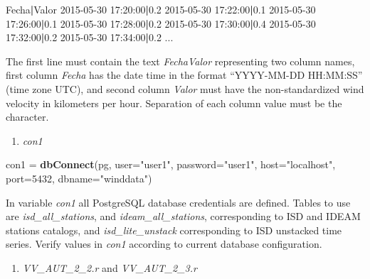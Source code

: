 \documentclass[12pt,twoside]{reedthesis}
\newenvironment{Shaded}{\begin{snugshade}}{\end{snugshade}}
\newcommand{\DataTypeTok}[1]{\textcolor[rgb]{0.13,0.29,0.53}{#1}}
\newcommand{\DecValTok}[1]{\textcolor[rgb]{0.00,0.00,0.81}{#1}}
\newcommand{\ExtensionTok}[1]{#1}
\newcommand{\KeywordTok}[1]{\textcolor[rgb]{0.13,0.29,0.53}{\textbf{#1}}}
\newcommand{\NormalTok}[1]{#1}
\newcommand{\StringTok}[1]{\textcolor[rgb]{0.31,0.60,0.02}{#1}}
\providecommand{\tightlist}{%
  \setlength{\itemsep}{0pt}\setlength{\parskip}{0pt}}
\begin{document}
\vspace{0.4cm}
\begin{Shaded}
\begin{Highlighting}[]
      \ExtensionTok{Fecha}\KeywordTok{|}\ExtensionTok{Valor}
      \ExtensionTok{2015-05-30}\NormalTok{ 17:20:00}\KeywordTok{|}\ExtensionTok{0.2}
      \ExtensionTok{2015-05-30}\NormalTok{ 17:22:00}\KeywordTok{|}\ExtensionTok{0.1}
      \ExtensionTok{2015-05-30}\NormalTok{ 17:26:00}\KeywordTok{|}\ExtensionTok{0.1}
      \ExtensionTok{2015-05-30}\NormalTok{ 17:28:00}\KeywordTok{|}\ExtensionTok{0.2}
      \ExtensionTok{2015-05-30}\NormalTok{ 17:30:00}\KeywordTok{|}\ExtensionTok{0.4}
      \ExtensionTok{2015-05-30}\NormalTok{ 17:32:00}\KeywordTok{|}\ExtensionTok{0.2}
      \ExtensionTok{2015-05-30}\NormalTok{ 17:34:00}\KeywordTok{|}\ExtensionTok{0.2}
      \ExtensionTok{...}
\end{Highlighting}
\end{Shaded}
\normalsize

The first line must contain the text \emph{Fecha\textbar Valor} representing two column names, first column \emph{Fecha} has the date time in the format ``YYYY-MM-DD HH:MM:SS'' (time zone UTC), and second column \emph{Valor} must have the non-standardized wind velocity in kilometers per hour. Separation of each column value must be the \emph{\textbar{}} character.
\begin{enumerate}
\def\labelenumi{\arabic{enumi}.}
\setcounter{enumi}{2}
\tightlist
\item
  \emph{con1}
\end{enumerate}
\scriptsize

\vspace{0.4cm}
\begin{Shaded}
\begin{Highlighting}[]
\NormalTok{      con1 =}\StringTok{ }\KeywordTok{dbConnect}\NormalTok{(pg, }\DataTypeTok{user=}\StringTok{"user1"}\NormalTok{, }\DataTypeTok{password=}\StringTok{"user1"}\NormalTok{, }\DataTypeTok{host=}\StringTok{"localhost"}\NormalTok{, }\DataTypeTok{port=}\DecValTok{5432}\NormalTok{, }\DataTypeTok{dbname=}\StringTok{"winddata"}\NormalTok{)}
\end{Highlighting}
\end{Shaded}
\normalsize

In variable \emph{con1} all PostgreSQL database credentials are defined. Tables to use are \emph{isd\_all\_stations}, and \emph{ideam\_all\_stations}, corresponding to ISD and IDEAM stations catalogs, and \emph{isd\_lite\_unstack} corresponding to ISD unstacked time series. Verify values in \emph{con1} according to current database configuration.
\begin{enumerate}
\def\labelenumi{\arabic{enumi}.}
\setcounter{enumi}{3}
\tightlist
\item
  \emph{VV\_AUT\_2\_2.r} and \emph{VV\_AUT\_2\_3.r}
\end{enumerate}
\scriptsize
\end{document}
